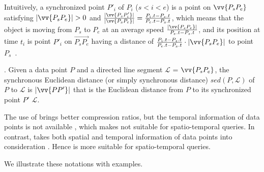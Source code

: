 Intuitively, a synchronized point $P'_i$ of $P_i$ ($s<i<e$) is a point on $\vv{P_sP_{e}}$ satisfying $|\vv{P_sP_e}|>0$ and $\frac{|\vv{P_sP'_i}|}{|\vv{P_sP_e}|} = \frac{P_i.t - P_s.t}{P_e.t - P_s.t}$, which means that the object is moving from $P_s$ to $P_e$ at an average speed $\frac{|\vv{P_sP_e}|}{P_e.t-P_s.t}$, and its position at time $t_i$ is point $P'_i$ on $\overrightarrow{P_sP_{e}}$ having a distance of $\frac{P_i.t - P_s.t}{P_e.t - P_s.t}\cdot|\vv{P_sP_e}|$ to point $P_s$~\cite{Meratnia:Spatiotemporal, Chen:Fast, Zhang:Evaluation}.

. Given a data point $P$ and a directed line segment $\mathcal{L}$ = $\vv{P_{s}P_{e}}$, the synchronous Euclidean distance (or simply synchronous distance) $sed(P, \mathcal{L})$ of $P$ to $\mathcal{L}$ is $|\vv{PP'}|$ that is the Euclidean distance from $P$ to its synchronized point $P'$ \wrt $\mathcal{L}$. %

The use of \ped brings better compression ratios, but the temporal information of data points is not available \cite{Meratnia:Spatiotemporal}, which makes \ped not suitable for spatio-temporal queries.  In contrast, \sed takes both spatial and temporal information of data points into consideration \cite{Meratnia:Spatiotemporal}. Hence \sed is more suitable for spatio-temporal queries.


We illustrate these notations with examples.


